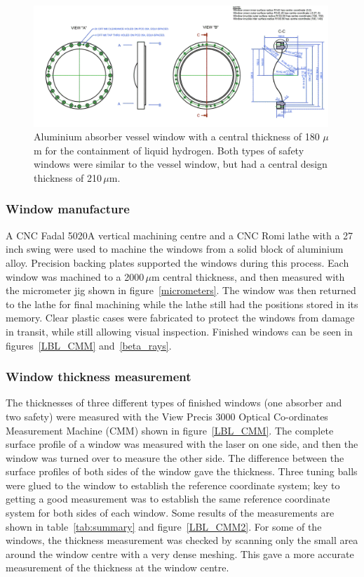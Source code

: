 \begin{figure}
  \centerline{\includegraphics*[width=0.99\textwidth]{LH2Absorber2.pdf}}
  \caption{
    Aluminium absorber vessel window with a central thickness of 180 $\mu$m
    for the containment of liquid hydrogen. 
    Both types of safety windows were similar to the vessel window,
  but had a central design thickness of 210\,$\mu$m.
  } 
  \label{AbsorberWindow}
\end{figure}

\subsubsection{Window manufacture}

A CNC Fadal 5020A vertical machining centre and a CNC Romi lathe with
a 27 inch swing were used to machine the windows from a solid block of
aluminium alloy. 
Precision backing plates supported the windows during this process.
Each window was machined to a 2000\,$\mu$m central thickness, and then
measured with the micrometer jig shown in figure~\ref{micrometers}. 
The window was then returned to the lathe for final machining while the
lathe still had the positions stored in its memory.
Clear plastic cases were fabricated to protect the windows from damage
in transit, while still allowing visual inspection.
Finished windows can be seen in figures~\ref{LBL_CMM}
and~\ref{beta_rays}. 

\subsubsection{Window thickness measurement}

The thicknesses of three different types of finished windows
(one absorber and two safety) were measured
with the View Precis 3000 Optical Co-ordinates Measurement Machine
(CMM) shown in figure~\ref{LBL_CMM}.
The complete surface profile of a window was measured with the laser
on one side, and then the window was turned over to measure the other
side.  
The difference between the surface profiles of both sides of the
window gave the thickness.  
Three tuning balls were glued to the window to establish the reference
coordinate system; key to getting a good measurement was to establish
the same reference coordinate system for both sides of each window.
Some results of the measurements are
shown in table~\ref{tab:summary} and figure~\ref{LBL_CMM2}.
For some of the windows, the thickness measurement was checked by
scanning only the small area around the window centre with a very
dense meshing. 
This gave a more accurate measurement of the thickness at the window
centre.

